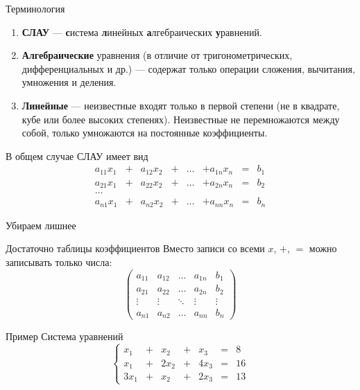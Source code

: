 \documentclass[12pt,aspectratio=169]{beamer}
\begin{document}
\begin{frame}[fragile]{Терминология}
    \begin{enumerate}
        \item \textbf{СЛАУ} --- \textbf{с}истема \textbf{л}инейных \textbf{а}лгебраических \textbf{у}равнений.
        \item \textbf{Алгебраические} уравнения (в отличие от тригонометрических, дифференциальных и др.) --- содержат только операции сложения, вычитания, умножения и деления.
        \item \textbf{Линейные} --- неизвестные входят только в первой степени (не в квадрате, кубе или более высоких степенях). Неизвестные не перемножаются между собой, только умножаются на постоянные коэффициенты.
    \end{enumerate}
    В общем случае СЛАУ имеет вид
    \[
    \begin{array}{cccccccc}
        a_{11}x_1 & + & a_{12}x_2 & + & \ldots & + a_{1n}x_n & = & b_1 \\
        a_{21}x_1 & + & a_{22}x_2 & + & \ldots & + a_{2n}x_n & = & b_2 \\
        \ldots \\
        a_{n1}x_1 & + & a_{n2}x_2 & + & \ldots & + a_{nn}x_n & = & b_n
    \end{array}
    \]
\end{frame}

\begin{frame}{Убираем лишнее}
    \begin{block}{Достаточно таблицы коэффициентов}
        Вместо записи со всеми \(x\), \(+\), \(=\) можно записывать только числа:
        \[
        \left(\begin{array}{cccc|c}
            a_{11} & a_{12} & \ldots & a_{1n} & b_1 \\
            a_{21} & a_{22} & \ldots & a_{2n} & b_2 \\
            \vdots & \vdots & \ddots & \vdots & \vdots \\
            a_{n1} & a_{n2} & \ldots & a_{nn} & b_n
        \end{array}\right)
        \]
    \end{block}
\end{frame}

\begin{frame}{Пример}
   Система уравнений
    \[
        \left\{
        \begin{array}{ccccccc}
          x_1 & + &  x_2 & + &  x_3 & = &  8 \\
          x_1 & + & 2x_2 & + & 4x_3 & = & 16 \\
         3x_1 & + &  x_2 & + & 2x_3 & = & 13
        \end{array}
        \right.
    \]
\end{frame}
\end{document}
